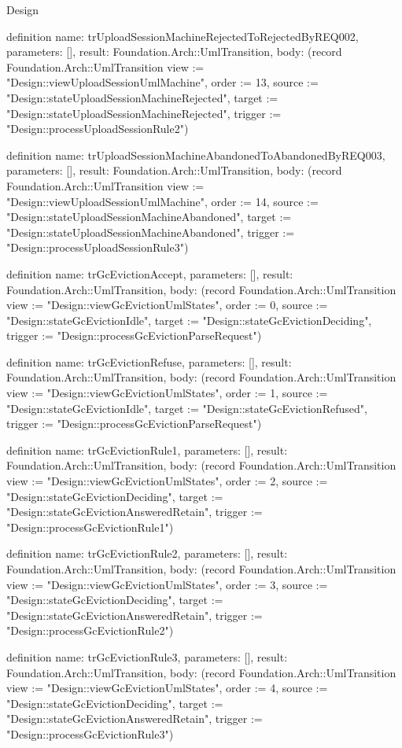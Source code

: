 \begin{lexlean}{Design}
\begin{semanticmodule}
definition{
  name: trUploadSessionMachineRejectedToRejectedByREQ002,
  parameters: [],
  result: Foundation.Arch::UmlTransition,
  body: (record Foundation.Arch::UmlTransition {view := "Design::viewUploadSessionUmlMachine", order := 13, source := "Design::stateUploadSessionMachineRejected", target := "Design::stateUploadSessionMachineRejected", trigger := "Design::processUploadSessionRule2"})
}

definition{
  name: trUploadSessionMachineAbandonedToAbandonedByREQ003,
  parameters: [],
  result: Foundation.Arch::UmlTransition,
  body: (record Foundation.Arch::UmlTransition {view := "Design::viewUploadSessionUmlMachine", order := 14, source := "Design::stateUploadSessionMachineAbandoned", target := "Design::stateUploadSessionMachineAbandoned", trigger := "Design::processUploadSessionRule3"})
}

definition{
  name: trGcEvictionAccept,
  parameters: [],
  result: Foundation.Arch::UmlTransition,
  body: (record Foundation.Arch::UmlTransition {view := "Design::viewGcEvictionUmlStates", order := 0, source := "Design::stateGcEvictionIdle", target := "Design::stateGcEvictionDeciding", trigger := "Design::processGcEvictionParseRequest"})
}

definition{
  name: trGcEvictionRefuse,
  parameters: [],
  result: Foundation.Arch::UmlTransition,
  body: (record Foundation.Arch::UmlTransition {view := "Design::viewGcEvictionUmlStates", order := 1, source := "Design::stateGcEvictionIdle", target := "Design::stateGcEvictionRefused", trigger := "Design::processGcEvictionParseRequest"})
}

definition{
  name: trGcEvictionRule1,
  parameters: [],
  result: Foundation.Arch::UmlTransition,
  body: (record Foundation.Arch::UmlTransition {view := "Design::viewGcEvictionUmlStates", order := 2, source := "Design::stateGcEvictionDeciding", target := "Design::stateGcEvictionAnsweredRetain", trigger := "Design::processGcEvictionRule1"})
}

definition{
  name: trGcEvictionRule2,
  parameters: [],
  result: Foundation.Arch::UmlTransition,
  body: (record Foundation.Arch::UmlTransition {view := "Design::viewGcEvictionUmlStates", order := 3, source := "Design::stateGcEvictionDeciding", target := "Design::stateGcEvictionAnsweredRetain", trigger := "Design::processGcEvictionRule2"})
}

definition{
  name: trGcEvictionRule3,
  parameters: [],
  result: Foundation.Arch::UmlTransition,
  body: (record Foundation.Arch::UmlTransition {view := "Design::viewGcEvictionUmlStates", order := 4, source := "Design::stateGcEvictionDeciding", target := "Design::stateGcEvictionAnsweredRetain", trigger := "Design::processGcEvictionRule3"})
}


\end{semanticmodule}
\end{lexlean}
